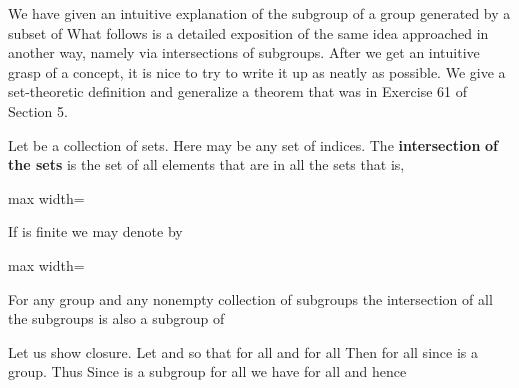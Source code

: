 \documentclass[11pt,oneside]{article}
\begin{document}
\begin{BookBody}

We have given an intuitive explanation of the subgroup of a group  generated by a subset of  What follows is a detailed exposition of the same idea approached in another way, namely via intersections of subgroups. After we get an intuitive grasp of a concept, it is nice to try to write it up as neatly as possible. We give a set-theoretic definition and generalize a theorem that was in Exercise 61 of Section 5.

 Let  be a collection of sets. Here  may be any set of indices. The\textbf{ intersection}  \textbf{of the sets}  is the set of all elements that are in all the sets  that is,

\begin{center}\begin{adjustbox}{max width=\linewidth}\end{adjustbox}\end{center}

\noindent If  is finite we may denote  by

\begin{center}\begin{adjustbox}{max width=\linewidth}\end{adjustbox}\end{center} \BookEnd{\blacksquare}

 For any group  and any nonempty collection of subgroups  the intersection of all the subgroups  is also a subgroup of 

 Let us show closure. Let  and  so that  for all  and  for all  Then  for all  since  is a group. Thus  Since  is a subgroup for all  we have  for all  and hence 


\end{BookBody}
\end{document}
